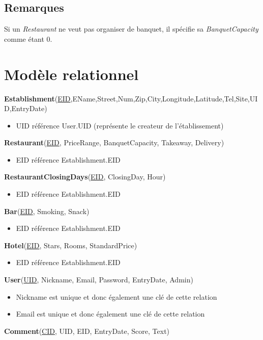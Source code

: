 \documentclass[11pt,a4paper]{report}
\begin{document}
\subsection*{Remarques}
Si un \textit{Restaurant} ne veut pas organiser de banquet, il spécifie sa \textit{BanquetCapacity} comme étant 0.

\section*{Modèle relationnel}
\noindent
\textbf{Establishment}(\underline{EID},EName,Street,Num,Zip,City,Longitude,Latitude,Tel,Site,UID,EntryDate)
\begin{itemize}
\item UID référence User.UID (représente le createur de l'établissement)\\
\end{itemize}
\textbf{Restaurant}(\underline{EID}, PriceRange, BanquetCapacity, Takeaway, Delivery)
\begin{itemize}
\item EID référence Establishment.EID\\
\end{itemize} 
\textbf{RestaurantClosingDays}(\underline{EID}, ClosingDay, Hour)
\begin{itemize}
\item EID référence Establishment.EID\\
\end{itemize}
\textbf{Bar}(\underline{EID}, Smoking, Snack)
\begin{itemize}
\item EID référence Establishment.EID\\
\end{itemize}
\textbf{Hotel}(\underline{EID}, Stars, Rooms, StandardPrice)
\begin{itemize}
\item EID référence Establishment.EID\\
\end{itemize}
\textbf{User}(\underline{UID}, Nickname, Email, Password, EntryDate, Admin)
\begin{itemize}
\item Nickname est unique et donc également une clé de cette relation
\item Email est unique et donc également une clé de cette relation\\
\end{itemize}
\textbf{Comment}(\underline{CID}, UID, EID, EntryDate, Score,  Text)
\end{document}
